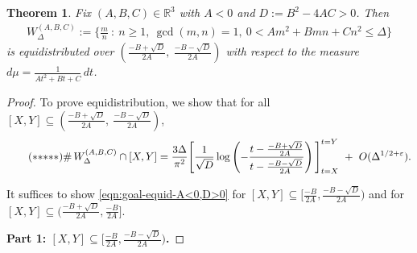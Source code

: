 \documentclass[11pt,letterpaper,reqno]{amsart}
\newtheorem{theorem}{Theorem}[section]
\numberwithin{equation}{section}
\numberwithin{figure}{section}
\numberwithin{table}{section}
\newcommand{\lrp}[1]{\left(#1\right)}
\newcommand{\RR}{\mathbb{R}}
\begin{document}
{
\renewcommand{\thetheorem}{\ref{thm:equid-WABC} (\(A<0,D>0\))}
\begin{theorem} \label{thm:equid-W--A<0,D>0}
Fix $(A,B,C) \in \RR^3$ with $A < 0$ and $D := B^2-4AC > 0$. Then
\begin{align}
    W_{\Delta}^{(A,B,C)} := \Big\{\frac{m}{n} ~:~ n\ge 1,~ \gcd(m,n)=1,~   0 < A m^2 + B mn + C n^2  \le \Delta
    \Big\}
\end{align}
is equidistributed over  $(\frac{-B+\sqrt{D}}{2A},~ \frac{-B-\sqrt{D}}{2A})$ with respect to the measure $d\mu = \frac{1}{At^2+Bt+C} \,dt$.
\end{theorem}
}
\begin{proof}
To prove equidistribution, we show that for all $[X, Y] \subseteq (\frac{-B+\sqrt{D}}{2A},~ \frac{-B-\sqrt{D}}{2A})$,
\begin{align} \label{eqn:goal-equid-A<0,D>0} \tag{$*{*}{*}{*}*$}
    \#\, W_{\Delta}^{(A,B,C)} \cap [X,Y] = 
    \frac{3\Delta}{\pi^2}
    \Bigg[ 
        \frac1{\sqrt D}
        \log\lrp{
        -\frac{
            t - \frac{-B+\sqrt{D}}{2A}
        }{
            t - \frac{-B-\sqrt{D}}{2A}
        }
        }
    \Bigg]_{t=X}^{t=Y} 
         ~+~ O(\Delta^{1/2+\varepsilon}).
\end{align}



It suffices to show \eqref{eqn:goal-equid-A<0,D>0} for $[X,Y] \subseteq [\frac{-B}{2A}, \frac{-B-\sqrt{D}}{2A})$ and for $[X,Y] \subseteq (\frac{-B+\sqrt{D}}{2A}, \frac{-B}{2A}]$.

\noindent
\textbf{Part 1: $[X,Y] \subseteq [\frac{-B}{2A}, \frac{-B-\sqrt{D}}{2A})$.}


\end{proof}
\end{document}
